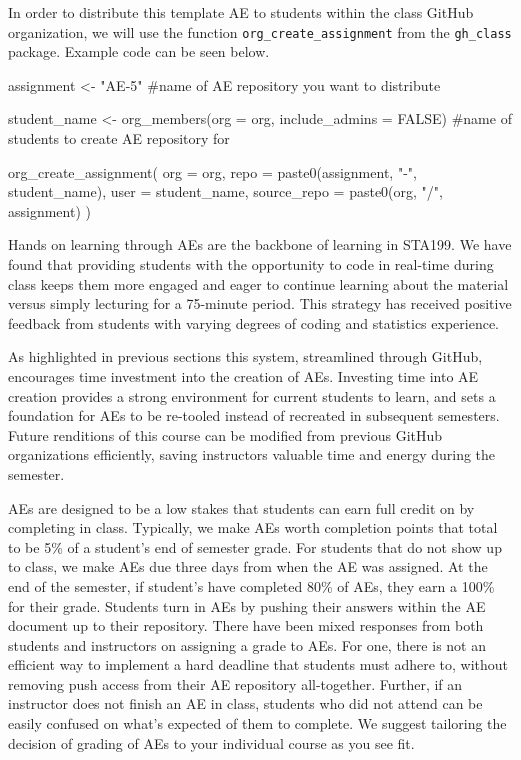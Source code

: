 \documentclass[
  12pt]{article}
\newenvironment{Shaded}{\begin{snugshade}}{\end{snugshade}}
\newcommand{\AttributeTok}[1]{\textcolor[rgb]{0.40,0.45,0.13}{#1}}
\newcommand{\CommentTok}[1]{\textcolor[rgb]{0.37,0.37,0.37}{#1}}
\newcommand{\ConstantTok}[1]{\textcolor[rgb]{0.56,0.35,0.01}{#1}}
\newcommand{\FunctionTok}[1]{\textcolor[rgb]{0.28,0.35,0.67}{#1}}
\newcommand{\NormalTok}[1]{\textcolor[rgb]{0.00,0.23,0.31}{#1}}
\newcommand{\OtherTok}[1]{\textcolor[rgb]{0.00,0.23,0.31}{#1}}
\newcommand{\StringTok}[1]{\textcolor[rgb]{0.13,0.47,0.30}{#1}}
\begin{document}
In order to distribute this template AE to students within the class
GitHub organization, we will use the function
\texttt{org\_create\_assignment} from the \texttt{gh\_class} package.
Example code can be seen below.

\begin{Shaded}
\begin{Highlighting}[]
\NormalTok{assignment }\OtherTok{\textless{}{-}} \StringTok{"AE{-}5"} \CommentTok{\#name of AE repository you want to distribute }

\NormalTok{student\_name }\OtherTok{\textless{}{-}} \FunctionTok{org\_members}\NormalTok{(}\AttributeTok{org =}\NormalTok{ org, }\AttributeTok{include\_admins =} \ConstantTok{FALSE}\NormalTok{) }\CommentTok{\#name of students to create AE repository for}

\FunctionTok{org\_create\_assignment}\NormalTok{(}
  \AttributeTok{org =}\NormalTok{ org,}
  \AttributeTok{repo =} \FunctionTok{paste0}\NormalTok{(assignment, }\StringTok{"{-}"}\NormalTok{, student\_name),}
  \AttributeTok{user =}\NormalTok{ student\_name,}
  \AttributeTok{source\_repo =} \FunctionTok{paste0}\NormalTok{(org, }\StringTok{"/"}\NormalTok{, assignment)}
\NormalTok{)}
\end{Highlighting}
\end{Shaded}

Hands on learning through AEs are the backbone of learning in STA199. We
have found that providing students with the opportunity to code in
real-time during class keeps them more engaged and eager to continue
learning about the material versus simply lecturing for a 75-minute
period. This strategy has received positive feedback from students with
varying degrees of coding and statistics experience.

As highlighted in previous sections this system, streamlined through
GitHub, encourages time investment into the creation of AEs. Investing
time into AE creation provides a strong environment for current students
to learn, and sets a foundation for AEs to be re-tooled instead of
recreated in subsequent semesters. Future renditions of this course can
be modified from previous GitHub organizations efficiently, saving
instructors valuable time and energy during the semester.

AEs are designed to be a low stakes that students can earn full credit
on by completing in class. Typically, we make AEs worth completion
points that total to be 5\% of a student's end of semester grade. For
students that do not show up to class, we make AEs due three days from
when the AE was assigned. At the end of the semester, if student's have
completed 80\% of AEs, they earn a 100\% for their grade. Students turn
in AEs by pushing their answers within the AE document up to their
repository. There have been mixed responses from both students and
instructors on assigning a grade to AEs. For one, there is not an
efficient way to implement a hard deadline that students must adhere to,
without removing push access from their AE repository all-together.
Further, if an instructor does not finish an AE in class, students who
did not attend can be easily confused on what's expected of them to
complete. We suggest tailoring the decision of grading of AEs to your
individual course as you see fit.
\end{document}
